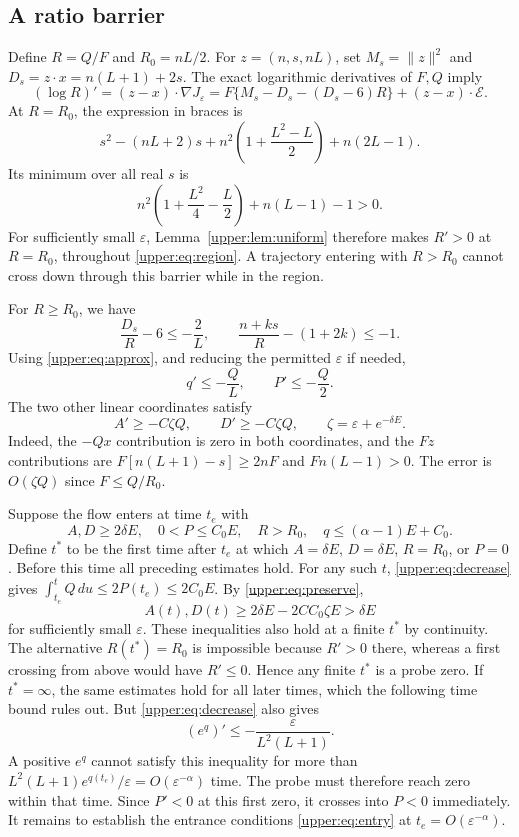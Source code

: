 \documentclass[11pt]{article}
\newcommand{\eps}{\varepsilon}\newcommand{\R}{\mathbb R}
\begin{document}
\subsection{A ratio barrier}
Define $R=Q/F$ and $R_0=nL/2$. For $z=(n,s,nL)$, set
$M_s=\|z\|^2$ and $D_s=z\cdot x=n(L+1)+2s$. The exact logarithmic
derivatives of $F,Q$ imply
\begin{equation}\label{upper:eq:ratio}
 (\log R)'=(z-x)\cdot\nabla J_\eps
 =F\{M_s-D_s-(D_s-6)R\}+(z-x)\cdot\mathcal E.
\end{equation}
At $R=R_0$, the expression in braces is
\[
 s^2-(nL+2)s+n^2\left(1+\frac{L^2-L}{2}\right)+n(2L-1).
\]
Its minimum over all real $s$ is
\begin{equation}\label{upper:eq:margin}
 n^2\left(1+\frac{L^2}{4}-\frac L2\right)+n(L-1)-1>0.
\end{equation}
For sufficiently small $\eps$, Lemma~\ref{upper:lem:uniform} therefore makes
$R'>0$ at $R=R_0$, throughout \eqref{upper:eq:region}. A trajectory entering
with $R>R_0$ cannot cross down through this barrier while in the region.

For $R\ge R_0$, we have
\[
 \frac{D_s}{R}-6\le-\frac2L,\qquad
 \frac{n+ks}{R}-(1+2k)\le-1.
\]
Using \eqref{upper:eq:approx}, and reducing the permitted $\eps$ if needed,
\begin{equation}\label{upper:eq:decrease}
 q'\le-\frac QL,\qquad P'\le-\frac Q2.
\end{equation}
The two other linear coordinates satisfy
\begin{equation}\label{upper:eq:preserve}
 A'\ge-C\zeta Q,\qquad D'\ge-C\zeta Q,
 \qquad \zeta=\eps+e^{-\delta E}.
\end{equation}
Indeed, the $-Qx$ contribution is zero in both coordinates, and the $Fz$
contributions are $F[n(L+1)-s]\ge2nF$ and $Fn(L-1)>0$. The error is
$O(\zeta Q)$ since $F\le Q/R_0$.

Suppose the flow enters at time $t_e$ with
\begin{equation}\label{upper:eq:entry}
 A,D\ge2\delta E,\quad 0<P\le C_0E,\quad R>R_0,
 \quad q\le(\alpha-1)E+C_0.
\end{equation}
Define $t^*$ to be the first time after $t_e$ at which $A=\delta E$,
$D=\delta E$, $R=R_0$, or $P=0$. Before this time all preceding estimates
hold. For any such $t$, \eqref{upper:eq:decrease} gives
$\int_{t_e}^tQ\,du\le2P(t_e)\le2C_0E$. By \eqref{upper:eq:preserve},
\[
 A(t),D(t)\ge2\delta E-2CC_0\zeta E>\delta E
\]
for sufficiently small $\eps$. These inequalities also hold at a finite
$t^*$ by continuity. The alternative $R(t^*)=R_0$ is impossible because
$R'>0$ there, whereas a first crossing from above would have $R'\le0$.
Hence any finite $t^*$ is a probe zero. If $t^*=\infty$, the same estimates
hold for all later times, which the following time bound rules out.
But \eqref{upper:eq:decrease} also gives
\[
 (e^q)'\le-\frac{\eps}{L^2(L+1)}.
\]
A positive $e^q$ cannot satisfy this inequality for more than
$L^2(L+1)e^{q(t_e)}/\eps=O(\eps^{-\alpha})$ time. The probe must
therefore reach zero within that time. Since $P'<0$ at this first zero,
it crosses into $P<0$ immediately. It remains to establish the entrance
conditions \eqref{upper:eq:entry} at $t_e=O(\eps^{-\alpha})$.
\end{document}
